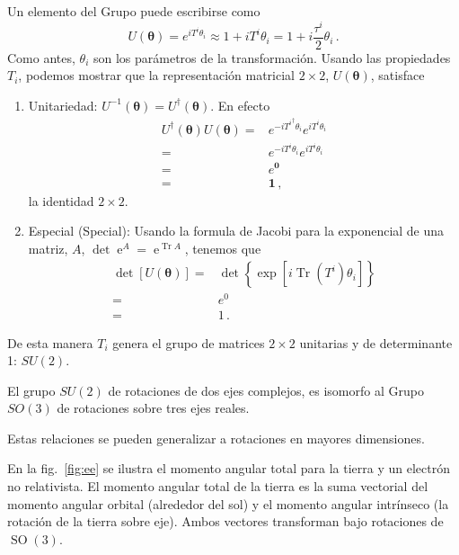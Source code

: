 \begin{frame}
Un elemento del Grupo puede escribirse como
\begin{equation}
  \label{eq:63qft}
  U(\boldsymbol{\theta})=e^{iT^i \theta_i }\approx1+iT^i\theta_i=1+i\frac{\tau^i}{2}\theta_i\,.
\end{equation}
Como antes, $\theta_i$ son los parámetros de la transformación.  Usando las propiedades $T_i$, podemos mostrar que la representación matricial $2\times 2$, $U(\boldsymbol{\theta})$, satisface
\begin{enumerate}
\item Unitariedad: $U^{-1}(\boldsymbol{\theta})=U^{\dagger}(\boldsymbol{\theta})$. En efecto
  \begin{align*}
    U^{\dagger}(\boldsymbol{\theta})U(\boldsymbol{\theta})=&e^{-i{T^i}^{\dagger} \theta_i }e^{iT^i \theta_i }\nonumber\\
=&e^{-i T^i \theta_i }e^{iT^i \theta_i } \nonumber\\
=&e^{\mathbf{0}}\nonumber\\
=&\mathbf{1}\,,
  \end{align*}
la identidad $2\times 2$.
\item Especial (Special): Usando la formula de Jacobi para la exponencial de una matriz, $A$, $\operatorname{det}\operatorname{e}^{A}=\operatorname{e}^{\operatorname{Tr}A}$, tenemos que
  \begin{align*}
   \det[U(\boldsymbol{\theta})]=&\det\left\{\exp\left[  i \operatorname{Tr}\left( T^i \right)\theta_i \right]  \right\}\nonumber\\
                           =&e^{0}\nonumber\\
                           =&1\,.
  \end{align*}
\end{enumerate}
De esta manera $T_i$ genera el grupo de matrices $2\times 2$ unitarias y de determinante 1: $SU(2)$. 
\end{frame}

El grupo $SU(2)$ de rotaciones de dos ejes complejos, es isomorfo al Grupo $SO(3)$ de rotaciones sobre tres ejes reales.

Estas relaciones se pueden generalizar a rotaciones en mayores dimensiones.

En la fig.~\ref{fig:ee} se ilustra el momento angular total para la tierra y un electrón no relativista. El momento angular total de la tierra es la suma vectorial del momento angular orbital (alrededor del sol) y el momento angular intrínseco (la rotación de la tierra sobre eje). Ambos vectores transforman bajo rotaciones de $\operatorname{SO}(3)$.


